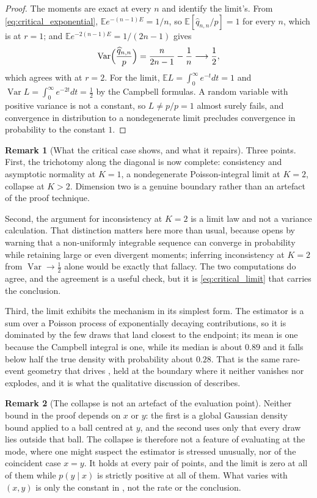 \documentclass[11pt]{article}
\theoremstyle{definition}
\newtheorem{remark}[remark]{Remark}
\newcommand{\E}{\mathbb{E}}
\newcommand{\Var}{\operatorname{Var}}
\begin{document}
\begin{proof}
The moments are exact at every $n$ and identify the limit's. From \eqref{eq:critical_exponential}, $\E e^{-(n-1)E}=1/n$, so $\E[\widehat q_{n,n}/p]=1$ for every $n$, which is  at $r=1$; and $\E e^{-2(n-1)E}=1/(2n-1)$ gives
\[
\Var\Bigl(\frac{\widehat q_{n,n}}{p}\Bigr)=\frac{n}{2n-1}-\frac1n\longrightarrow\frac12,
\]
which agrees with  at $r=2$. For the limit, $\E L=\int_0^\infty e^{-t}dt=1$ and $\Var L=\int_0^\infty e^{-2t}dt=\tfrac12$ by the Campbell formulas. A random variable with positive variance is not a constant, so $L\ne p/p=1$ almost surely fails, and convergence in distribution to a nondegenerate limit precludes convergence in probability to the constant $1$.
\end{proof}

\begin{remark}[What the critical case shows, and what it repairs]\label{rem:trichotomy}
Three points. First, the trichotomy along the diagonal is now complete: consistency and asymptotic normality at $K=1$, a nondegenerate Poisson-integral limit at $K=2$, collapse at $K>2$. Dimension two is a genuine boundary rather than an artefact of the proof technique.

Second, the argument for inconsistency at $K=2$ is a limit law and not a variance calculation. That distinction matters here more than usual, because  opens by warning that a non-uniformly integrable sequence can converge in probability while retaining large or even divergent moments; inferring inconsistency at $K=2$ from $\Var\to\tfrac12$ alone would be exactly that fallacy. The two computations do agree, and the agreement is a useful check, but it is \eqref{eq:critical_limit} that carries the conclusion.

Third, the limit exhibits the mechanism in its simplest form. The estimator is a sum over a Poisson process of exponentially decaying contributions, so it is dominated by the few draws that land closest to the endpoint; its mean is one because the Campbell integral is one, while its median is about $0.89$ and it falls below half the true density with probability about $0.28$. That is the same rare-event geometry that drives , held at the boundary where it neither vanishes nor explodes, and it is what the qualitative discussion of  describes.
\end{remark}

\begin{remark}[The collapse is not an artefact of the evaluation point]\label{rem:general_xy}
Neither bound in the proof depends on $x$ or $y$: the first is a global Gaussian density bound applied to a ball centred at $y$, and the second uses only that every draw lies outside that ball. The collapse is therefore not a feature of evaluating at the mode, where one might suspect the estimator is stressed unusually, nor of the coincident case $x=y$. It holds at every pair of points, and the limit is zero at all of them while $p(y\mid x)$ is strictly positive at all of them. What varies with $(x,y)$ is only the constant in , not the rate or the conclusion.
\end{remark}
\end{document}
